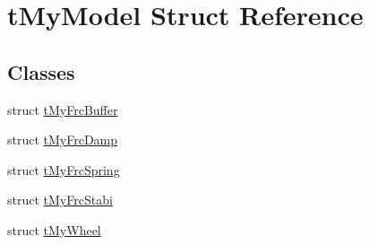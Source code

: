 \hypertarget{structt_my_model}{}\section{t\+My\+Model Struct Reference}
\label{structt_my_model}
\subsection*{Classes}
\begin{DoxyCompactItemize}
\item 
struct \mbox{\hyperlink{structt_my_model_1_1t_my_frc_buffer}{t\+My\+Frc\+Buffer}}
\item 
struct \mbox{\hyperlink{structt_my_model_1_1t_my_frc_damp}{t\+My\+Frc\+Damp}}
\item 
struct \mbox{\hyperlink{structt_my_model_1_1t_my_frc_spring}{t\+My\+Frc\+Spring}}
\item 
struct \mbox{\hyperlink{structt_my_model_1_1t_my_frc_stabi}{t\+My\+Frc\+Stabi}}
\item 
struct \mbox{\hyperlink{structt_my_model_1_1t_my_wheel}{t\+My\+Wheel}}
\end{DoxyCompactItemize}
